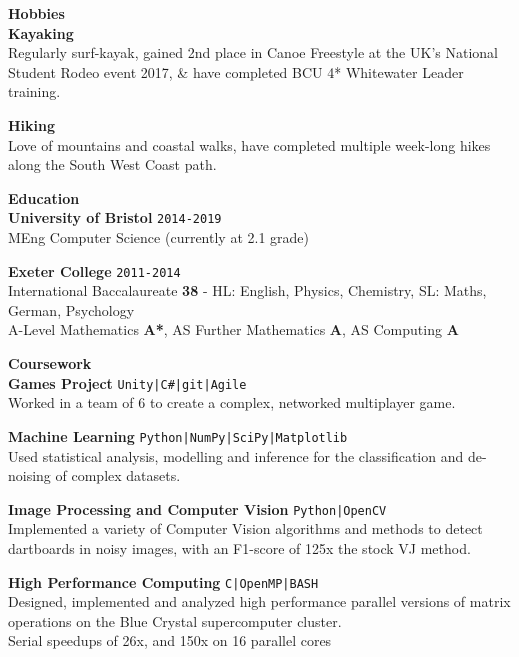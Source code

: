 \documentclass[10pt]{article}
\newcommand{\sect}[1]{{\LARGE{\textbf{#1}}}\vspace{0.1em}\\}
\newcommand{\xx}[2]{{\large\textbf{#1}}\\{#2}\vspace{0.5em}}
\newcommand{\zz}[3]{{\large\textbf{#1}} \hfill {\small \colorbox{boxcol}{\texttt{#3}} }\\{#2}\vspace{0.5em}}
\newcommand{\li}{\textcolor{linecol}{|}}
\begin{document}
\begin{minipage}[t]{0.33\textwidth}
\hspace{0.1em}

\sect{Hobbies}

\xx{Kayaking}
{Regularly surf-kayak, gained 2nd place in Canoe Freestyle at the UK's National Student Rodeo event 2017, \& have completed BCU 4* Whitewater Leader training.
}

\xx{Hiking}
{Love of mountains and coastal walks, have completed multiple week-long hikes along the South West Coast path.}







\end{minipage} 
\hfill
\begin{minipage}[t]{0.66\textwidth}







\sect{Education}
\zz{University of Bristol}{MEng Computer Science \small{(currently at 2.1 grade)}}{2014-2019}

\zz{Exeter College}{International Baccalaureate \textbf{38} {\scriptsize - HL: English, Physics, Chemistry, SL: Maths, German, Psychology}\\
A-Level Mathematics \textbf{A*}, 
AS Further Mathematics \textbf{A}, AS Computing \textbf{A}}{2011-2014}






\vspace{0.5em}




\raggedright
\sect{Coursework}
\zz{Games Project}
{Worked in a team of 6 to create a complex, networked multiplayer game.}{Unity\li C\#\li git\li Agile}

\zz{Machine Learning}
{Used statistical analysis, modelling and inference for the classification and de-noising of complex datasets.}{Python\li NumPy\li SciPy\li Matplotlib}

\zz{Image Processing and Computer Vision}
{Implemented a variety of Computer Vision algorithms and methods to detect dartboards in noisy images, with an F1-score of 125x the stock VJ method.}{Python\li OpenCV}

\zz{High Performance Computing}
{Designed, implemented and analyzed high performance parallel versions of matrix operations on the Blue Crystal supercomputer cluster.\\
Serial speedups of 26x, and 150x on 16 parallel cores}{C\li OpenMP\li BASH}


\end{minipage}
\end{document}
